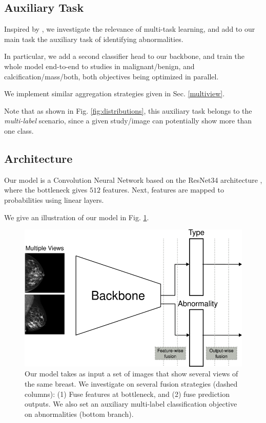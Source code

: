 \documentclass[11pt]{article}
\begin{document}
\subsection{Auxiliary Task}
\label{sec:org5b820e1}

Inspired by \autocite{tardy22}, we investigate the relevance of multi-task learning,
and add to our main task the auxiliary task of identifying
abnormalities.

In particular, we add a second classifier head to our backbone, and train the whole
model end-to-end to studies in malignant/benign, and calcification/mass/both,
both objectives being optimized in parallel.

We implement similar aggregation strategies given in Sec. \ref{multiview}.

Note that as shown in Fig. \ref{fig:distributions}, this auxiliary task belongs to the
\emph{multi-label} scenario, since a given study/image can potentially
show more than one class.

\subsection{Architecture}
\label{sec:org9f2deca}

Our model is a Convolution Neural Network based on the ResNet34
architecture \autocite{he15}, where the bottleneck gives \(512\) features.
Next, features are mapped to probabilities using linear layers.

We give an illustration of our model in Fig. \ref{fig:model}.

\begin{figure}[htbp]
\centering
\includegraphics[width=.9\linewidth]{./images/model.png}
\caption{\label{fig:model}Our model takes as input a set of images that show several views of the same breast. We investigate on several fusion strategies (dashed columns): (1) Fuse features at bottleneck, and (2) fuse prediction outputs. We also set an auxiliary multi-label classification objective on abnormalities (bottom branch).}
\end{figure}
\end{document}

